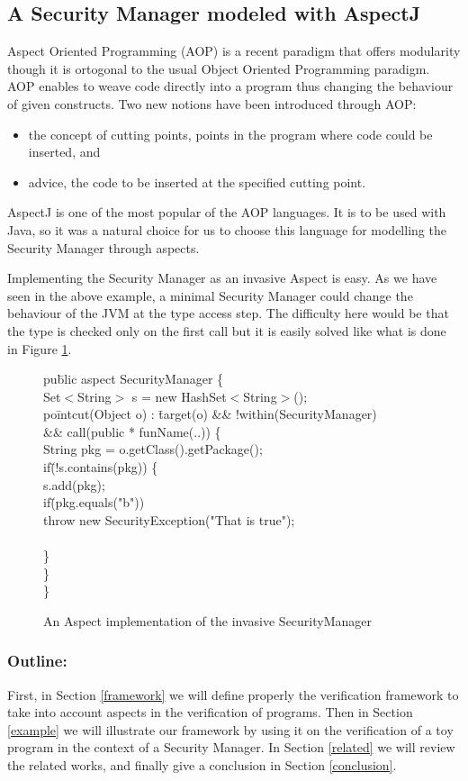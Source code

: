 \subsection{A Security Manager modeled with AspectJ}
Aspect Oriented Programming (AOP) is a recent paradigm that offers
modularity though it is ortogonal to the usual Object Oriented
Programming paradigm. AOP enables to weave code directly into a
program thus changing the behaviour of given constructs. Two new
notions have been introduced through AOP:
\begin{itemize}
\item the concept of cutting points, points in the program where code
could be inserted, and
\item advice, the code to be inserted at the specified cutting point.
\end{itemize}
AspectJ is one of the most popular of the AOP languages. It is to be
used with Java, so it was a natural choice for us to choose this
language for modelling the Security Manager through aspects.

Implementing the Security Manager as an invasive Aspect is easy.  As
we have seen in the above example, a minimal Security Manager could
change the behaviour of the JVM at the type access step. The
difficulty here would be that the type is checked only on the first
call but it is easily solved like what is done in Figure \ref{base_implem}.
%
\begin{figure}
\bcode
pu\=blic aspect SecurityManager \{\+\\

Set$<$String$>$ s = new HashSet$<$String$>$();\\
po\=intcut(Object o) : \=target(o) \&\& !within(SecurityManager)\+ \\
           \>\&\& call(public * funName(..)) \{\\
    String pkg = o.getClass().getPackage();\\
    if\=(!s.contains(pkg)) \{\+\\     
       s.add(pkg);\\
       if\=(pkg.equals("b"))\\
           \>throw new SecurityException("That is true");\\\-\\ 
    \}\-\\
\}\-\\
\}
\ecode
\caption{An Aspect implementation of the invasive SecurityManager}
\label{base_implem}
\end{figure}


\subsubsection{Outline:}
First, in Section \ref{framework} we will define properly the
verification framework to take into account aspects in the
verification of programs. Then in Section \ref{example} we will
illustrate our framework by using it on the verification of a toy
program in the context of a Security Manager. In Section \ref{related}
we will review the related works, and finally give a conclusion in
Section \ref{conclusion}.

